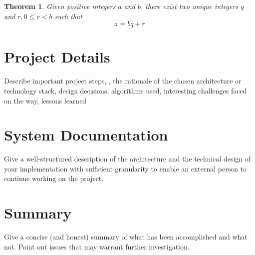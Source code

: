 \documentclass[english,notitlepage,smartquotes]{hgbreport}
\theoremstyle{definition}
\theoremstyle{remark}
\theoremstyle{plain}
\newtheorem{theorem}{Theorem}[chapter]
\begin{document}
\begin{theorem}
\label{thm:div-algo}
Given positive integers $a$ and $b$, there exist two unique integers $q$ and $r, 0\leq r<b$ such that  
$$
a=bq+r
$$
\end{theorem}
\chapter{Project Details}

Describe important project steps, \eg, the rationale of the chosen architecture
or technology stack, design decisions, algorithms used, interesting challenges
faced on the way, lessons learned \etc

\chapter{System Documentation}

Give a well-structured description of the architecture and the technical design
of your implementation with sufficient granularity to enable an external person
to continue working on the project.

\chapter{Summary}

Give a concise (and honest) summary of what has been accomplished and what not. 
Point out issues that may warrant further investigation.

\appendix                                                   %

\end{document}
